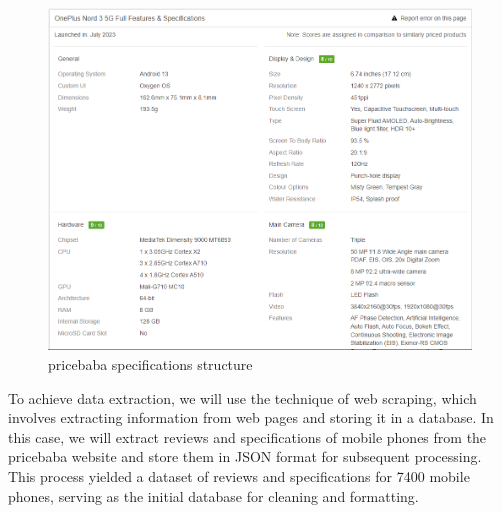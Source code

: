 \begin{figure}[H]
    \centering
    \includegraphics[width=12cm]{images/pricebaba_spec_structure.png}
    \caption{pricebaba specifications structure \cite{OnePlusNord35G2023}}
    \label{fig:pricebaba-spec-structure}
\end{figure}
To achieve data extraction, we will use the technique of web scraping, which involves extracting information from web pages and storing it in a database. In this case, we will extract reviews and specifications of mobile phones from the pricebaba website and store them in JSON format for subsequent processing. This process yielded a dataset of reviews and specifications for 7400 mobile phones, serving as the initial database for cleaning and formatting.

